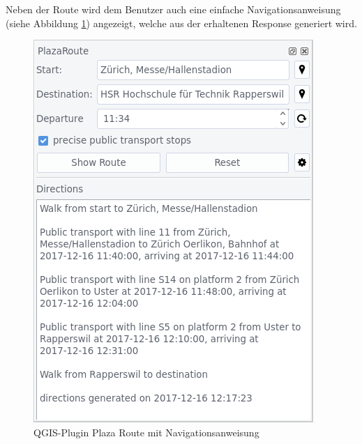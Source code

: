 Neben der Route wird dem Benutzer auch eine einfache Navigationsanweisung (siehe Abbildung \ref{fig:qgis_plugin_plaza_route_routing}) angezeigt, welche aus der erhaltenen Response generiert wird.

\begin{figure}[ht]
\centering
\includegraphics[width=0.7\linewidth]{projectdoc/img/qgis_plugin_plaza_route_routing}
\caption[QGIS-Plugin Plaza Route mit Navigationsanweisung]{QGIS-Plugin Plaza Route mit Navigationsanweisung}
\label{fig:qgis_plugin_plaza_route_routing}
\end{figure}

